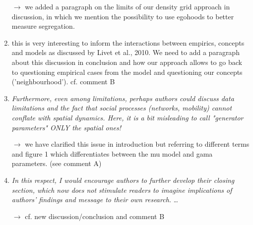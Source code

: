 \documentclass[11pt,a4paper,sans]{moderncv}        %
\begin{document}
\begin{enumerate}
  $\rightarrow$ we added a paragraph on the limits of our density grid approach in discussion, in which we mention the possibility to use egohoods to better measure segregation.
  
  \medskip
  
   \item this is very interesting to inform the interactions between empirics, concepts and models as discussed by Livet et al., 2010. We need to add a paragraph about this discussion in conclusion and how our approach allows to go back to questioning empirical cases from the model and questioning our concepts ('neighbourhood'). cf. comment B

  \medskip

  \item\textit{Furthermore, even among limitations, perhaps authors could discuss data limitations and the fact that social processes (networks, mobility) cannot conflate with spatial dynamics. Here, it is a bit misleading to call "generator parameters" ONLY the spatial ones!}
  
  $\rightarrow$ we have clarified this issue in introduction but referring to different terms and figure 1 which differentiates between the mu model and gama parameters. (see comment A)
 
 \medskip
 
 
  \item\textit{In this respect, I would encourage authors to further develop their closing section, which now does not stimulate readers to imagine implications of authors' findings and message to their own research.} \ldots
  
  $\rightarrow$ cf. new discussion/conclusion and comment B


\end{enumerate}






\end{document}
